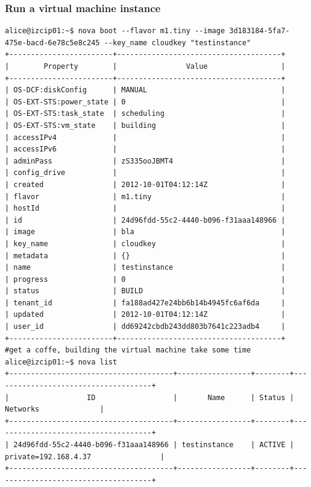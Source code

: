 \documentclass[a4paper,bibtotoc,english,liststotoc]{scrartcl}
\begin{document}
\subsubsection{Run a virtual machine instance}
\begin{verbatim}
alice@izcip01:~$ nova boot --flavor m1.tiny --image 3d183184-5fa7-475e-bacd-6e78c5e8c245 --key_name cloudkey "testinstance"
+------------------------+--------------------------------------+
|        Property        |                Value                 |
+------------------------+--------------------------------------+
| OS-DCF:diskConfig      | MANUAL                               |
| OS-EXT-STS:power_state | 0                                    |
| OS-EXT-STS:task_state  | scheduling                           |
| OS-EXT-STS:vm_state    | building                             |
| accessIPv4             |                                      |
| accessIPv6             |                                      |
| adminPass              | zS335ooJBMT4                         |
| config_drive           |                                      |
| created                | 2012-10-01T04:12:14Z                 |
| flavor                 | m1.tiny                              |
| hostId                 |                                      |
| id                     | 24d96fdd-55c2-4440-b096-f31aaa148966 |
| image                  | bla                                  |
| key_name               | cloudkey                             |
| metadata               | {}                                   |
| name                   | testinstance                         |
| progress               | 0                                    |
| status                 | BUILD                                |
| tenant_id              | fa188ad427e24bb6b14b4945fc6af6da     |
| updated                | 2012-10-01T04:12:14Z                 |
| user_id                | dd69242cbdb243dd803b7641c223adb4     |
+------------------------+--------------------------------------+
#get a coffe, building the virtual machine take some time
alice@izcip01:~$ nova list
+--------------------------------------+-----------------+--------+-------------------------------------+
|                  ID                  |       Name      | Status |               Networks              |
+--------------------------------------+-----------------+--------+-------------------------------------+
| 24d96fdd-55c2-4440-b096-f31aaa148966 | testinstance    | ACTIVE | private=192.168.4.37                |
+--------------------------------------+-----------------+--------+-------------------------------------+
\end{verbatim}
\end{document}
